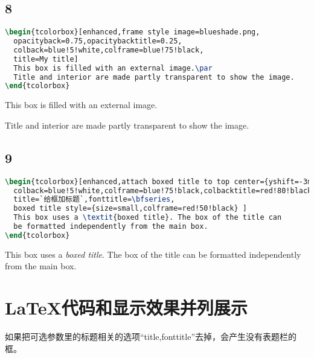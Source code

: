\documentclass{ctexart}
\begin{document}
\subsection{8}
\begin{lstlisting}[language={TeX}]
\begin{tcolorbox}[enhanced,frame style image=blueshade.png,
  opacityback=0.75,opacitybacktitle=0.25,
  colback=blue!5!white,colframe=blue!75!black,
  title=My title]
  This box is filled with an external image.\par
  Title and interior are made partly transparent to show the image.
\end{tcolorbox}
\end{lstlisting}
\begin{tcolorbox}[enhanced,frame style image=blueshade.png,
  opacityback=0.75,opacitybacktitle=0.25,
  colback=blue!5!white,colframe=blue!75!black,
  title=My title]
  This box is filled with an external image.\par
  Title and interior are made partly transparent to show the image.
\end{tcolorbox}

\subsection{9}
\begin{lstlisting}[language={TeX}]
\begin{tcolorbox}[enhanced,attach boxed title to top center={yshift=-3mm,yshifttext=-1mm},
  colback=blue!5!white,colframe=blue!75!black,colbacktitle=red!80!black,
  title=`给框加标题`,fonttitle=\bfseries,
  boxed title style={size=small,colframe=red!50!black} ]
  This box uses a \textit{boxed title}. The box of the title can
  be formatted independently from the main box.
\end{tcolorbox}
\end{lstlisting}
\begin{tcolorbox}[enhanced,attach boxed title to top center={yshift=-3mm,yshifttext=-1mm},
  colback=blue!5!white,colframe=blue!75!black,colbacktitle=red!80!black,
  title=给框加标题,fonttitle=\bfseries,
  boxed title style={size=small,colframe=red!50!black} ]
  This box uses a \textit{boxed title}. The box of the title can
  be formatted independently from the main box.
\end{tcolorbox}


\section{LaTeX代码和显示效果并列展示}
如果把可选参数里的标题相关的选项``title,fonttitle''去掉，会产生没有表题栏的框。
\end{document}
